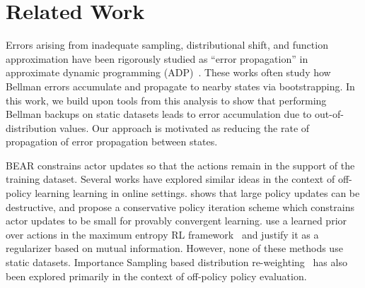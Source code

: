 \section{Related Work}
\label{sec:related}
\vspace{-10pt}

Errors arising from inadequate sampling, distributional shift, and function approximation have been rigorously studied as ``error propagation'' in approximate dynamic programming (ADP)~\citep{bertsekas1996ndp,munos2003errorapi,farahmand2010error,bruno2015approximate}. These works often study how Bellman errors accumulate and propagate to nearby states via bootstrapping. In this work, we build upon tools from this analysis to show that performing Bellman backups on static datasets leads to error accumulation due to out-of-distribution values. Our approach is motivated as reducing the rate of propagation of error propagation between states.


BEAR constrains actor updates so that the actions remain in the support of the training dataset. Several works have explored similar ideas in the context of off-policy learning learning in online settings. \citet{kakade2002cpi} shows that large policy updates can be destructive, and propose a conservative policy iteration scheme which constrains actor updates to be small for provably convergent learning. \citet{grau-moya2018soft} use a learned prior over actions in the maximum entropy RL framework~\citep{levine2018rlasinference} and justify it as a regularizer based on mutual information. However, none of these methods use static datasets. Importance Sampling based distribution re-weighting~\cite{munos2016safe,gelada2019off,precup2001offpol,mahmood2015emphatic} has also been explored primarily in the context of off-policy policy evaluation.

